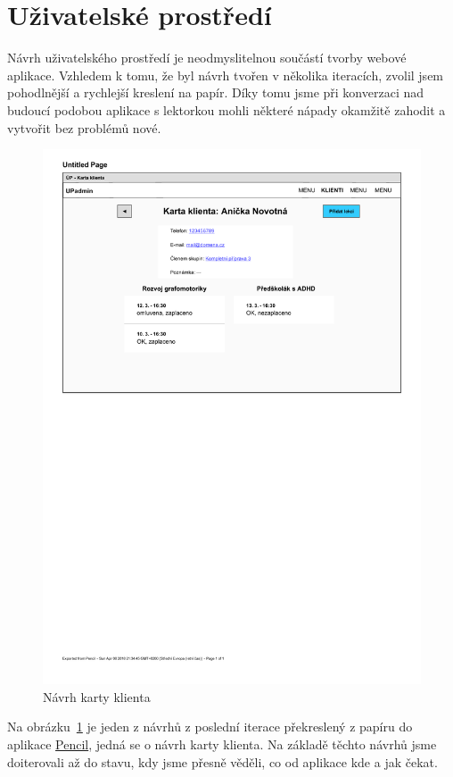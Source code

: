     \section{Uživatelské prostředí}
    Návrh uživatelského prostředí je neodmyslitelnou součástí tvorby webové aplikace. Vzhledem k tomu, že byl návrh tvořen v několika iteracích, zvolil jsem pohodlnější a rychlejší kreslení na papír. Díky tomu jsme při konverzaci nad budoucí podobou aplikace s lektorkou mohli některé nápady okamžitě zahodit a vytvořit bez problémů nové.
    
    \begin{figure}[ht]\centering
    	\includegraphics[width=1\textwidth]{img/ui-navrh}
    	\caption[Návrh karty klienta]{Návrh karty klienta}\label{fig:ui-navrh}
    \end{figure}
    
    Na obrázku~\ref{fig:ui-navrh} je jeden z návrhů z poslední iterace překreslený z papíru do aplikace \href{https://pencil.evolus.vn/}{Pencil}, jedná se o návrh karty klienta. Na základě těchto návrhů jsme doiterovali až do stavu, kdy jsme přesně věděli, co od aplikace kde a jak čekat.
    
